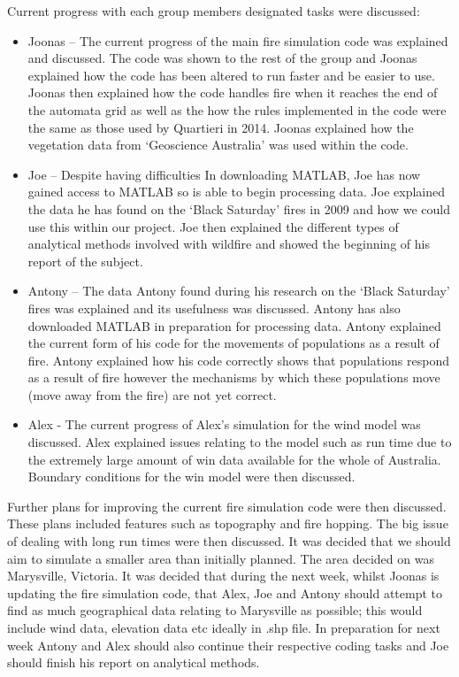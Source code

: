 Current progress with each group members designated tasks were discussed:
\begin{itemize}
    \item Joonas – The current progress of the main fire simulation code was explained and discussed. The code was shown to the rest of the group and Joonas explained how the code has been altered to run faster and be easier to use. Joonas then explained how the code handles fire when it reaches the end of the automata grid as well as the how the rules implemented in the code were the same as those used by Quartieri in 2014. Joonas explained how the vegetation data from ‘Geoscience Australia’ was used within the code.
    \item Joe – Despite having difficulties In downloading MATLAB, Joe has now gained access to MATLAB so is able to begin processing data. Joe explained the data he has found on the ‘Black Saturday’ fires in 2009 and how we could use this within our project. Joe then explained the different types of analytical methods involved with wildfire and showed the beginning of his report of the subject.
    \item Antony – The data Antony found during his research on the ‘Black Saturday’ fires was explained and its usefulness was discussed. Antony has also downloaded MATLAB in preparation for processing data. Antony explained the current form of his code for the movements of populations as a result of fire. Antony explained how his code correctly shows that populations respond as a result of fire however the mechanisms by which these populations move (move away from the fire) are not yet correct.
    \item Alex - The current progress of Alex’s simulation for the wind model was discussed. Alex explained issues relating to the model such as run time due to the extremely large amount of win data available for the whole of Australia. Boundary conditions for the win model were then discussed.
\end{itemize}

\noindent Further plans for improving the current fire simulation code were then discussed. These plans included features such as topography and fire hopping. The big issue of dealing with long run times were then discussed. It was decided that we should aim to simulate a smaller area than initially planned. The area decided on was Marysville, Victoria. It was decided that during the next week, whilst Joonas is updating the fire simulation code, that Alex, Joe and Antony should attempt to find as much geographical data relating to Marysville as possible; this would include wind data, elevation data etc ideally in .shp file. In preparation for next week Antony and Alex should also continue their respective coding tasks and Joe should finish his report on analytical methods.
